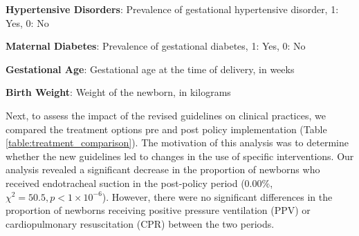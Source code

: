 \documentclass[11pt]{article}
\begin{document}
\begin{table}[h]
\caption{Descriptive statistics of key variables stratified by pre and post policy implementation}
\label{table:desc_stats}
\begin{threeparttable}
\renewcommand{\TPTminimum}{\linewidth}
\begin{tablenotes}
\footnotesize
\item \textbf{Hypertensive Disorders}: Prevalence of gestational hypertensive disorder, 1: Yes, 0: No
\item \textbf{Maternal Diabetes}: Prevalence of gestational diabetes, 1: Yes, 0: No
\item \textbf{Gestational Age}: Gestational age at the time of delivery, in weeks
\item \textbf{Birth Weight}: Weight of the newborn, in kilograms
\end{tablenotes}
\end{threeparttable}
\end{table}


Next, to assess the impact of the revised guidelines on clinical practices, we compared the treatment options pre and post policy implementation (Table {}\ref{table:treatment_comparison}). The motivation of this analysis was to determine whether the new guidelines led to changes in the use of specific interventions. Our analysis revealed a significant decrease in the proportion of newborns who received endotracheal suction in the post-policy period (0.00\%, \(\chi^2 = 50.5, p < 1 \times 10^{-6}\)). However, there were no significant differences in the proportion of newborns receiving positive pressure ventilation (PPV) or cardiopulmonary resuscitation (CPR) between the two periods.
\end{document}
